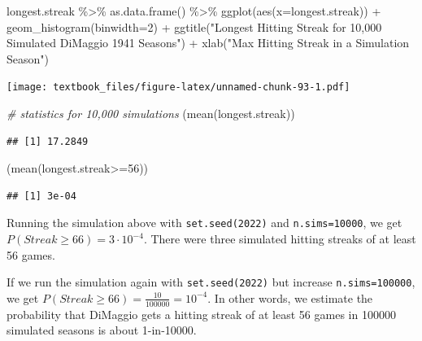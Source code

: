 \documentclass[
  11pt,
]{book}
\newenvironment{Shaded}{\begin{snugshade}}{\end{snugshade}}
\newcommand{\AttributeTok}[1]{\textcolor[rgb]{0.77,0.63,0.00}{#1}}
\newcommand{\CommentTok}[1]{\textcolor[rgb]{0.56,0.35,0.01}{\textit{#1}}}
\newcommand{\DecValTok}[1]{\textcolor[rgb]{0.00,0.00,0.81}{#1}}
\newcommand{\FunctionTok}[1]{\textcolor[rgb]{0.00,0.00,0.00}{#1}}
\newcommand{\NormalTok}[1]{#1}
\newcommand{\SpecialCharTok}[1]{\textcolor[rgb]{0.00,0.00,0.00}{#1}}
\newcommand{\StringTok}[1]{\textcolor[rgb]{0.31,0.60,0.02}{#1}}
\theoremstyle{definition}
\theoremstyle{definition}
\theoremstyle{definition}
\theoremstyle{definition}
\theoremstyle{remark}
\begin{document}
\begin{Shaded}
\begin{Highlighting}[]
\NormalTok{longest.streak }\SpecialCharTok{\%\textgreater{}\%} 
  \FunctionTok{as.data.frame}\NormalTok{() }\SpecialCharTok{\%\textgreater{}\%} 
  \FunctionTok{ggplot}\NormalTok{(}\FunctionTok{aes}\NormalTok{(}\AttributeTok{x=}\NormalTok{longest.streak)) }\SpecialCharTok{+} 
  \FunctionTok{geom\_histogram}\NormalTok{(}\AttributeTok{binwidth=}\DecValTok{2}\NormalTok{) }\SpecialCharTok{+}
  \FunctionTok{ggtitle}\NormalTok{(}\StringTok{"Longest Hitting Streak for 10,000 Simulated DiMaggio 1941 Seasons"}\NormalTok{) }\SpecialCharTok{+}
  \FunctionTok{xlab}\NormalTok{(}\StringTok{"Max Hitting Streak in a Simulation Season"}\NormalTok{)}
\end{Highlighting}
\end{Shaded}

\texttt{[image: textbook\_files/figure-latex/unnamed-chunk-93-1.pdf]}

\begin{Shaded}
\begin{Highlighting}[]
\CommentTok{\# statistics for 10,000 simulations}
\NormalTok{(}\FunctionTok{mean}\NormalTok{(longest.streak))}
\end{Highlighting}
\end{Shaded}

\begin{verbatim}
## [1] 17.2849
\end{verbatim}

\begin{Shaded}
\begin{Highlighting}[]
\NormalTok{(}\FunctionTok{mean}\NormalTok{(longest.streak}\SpecialCharTok{\textgreater{}=}\DecValTok{56}\NormalTok{))}
\end{Highlighting}
\end{Shaded}

\begin{verbatim}
## [1] 3e-04
\end{verbatim}

Running the simulation above with \texttt{set.seed(2022)} and \texttt{n.sims=10000}, we get \(P(Streak \geq 66) = 3 \cdot 10^{-4}\). There were three simulated hitting streaks of at least 56 games.

If we run the simulation again with \texttt{set.seed(2022)} but increase \texttt{n.sims=100000}, we get \(P(Streak \geq 66) = \frac{10}{100000} = 10^{-4}\). In other words, we estimate the probability that DiMaggio gets a hitting streak of at least 56 games in 100000 simulated seasons is about 1-in-10000.
\end{document}
